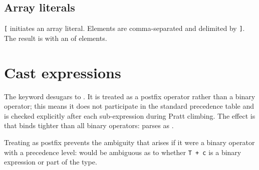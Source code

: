 \subsection{Array literals}

\pnum
\texttt{[} initiates an array literal.  Elements are comma-separated and
delimited by \texttt{]}.  The result is  with an
 of elements.

\section{Cast expressions}
\label{sec:par-expr-cast}

\pnum
The  keyword desugars to .  It is
treated as a postfix operator rather than a binary operator; this means it does
not participate in the standard precedence table and is checked explicitly after
each sub-expression during Pratt climbing.  The effect is that  binds
tighter than all binary operators:  parses as
.

\begin{rationale}
Treating  as postfix prevents the ambiguity that arises if it were a
binary operator with a precedence level:  would be
ambiguous as to whether \texttt{T + c} is a binary expression or part of the
type.
\end{rationale}
